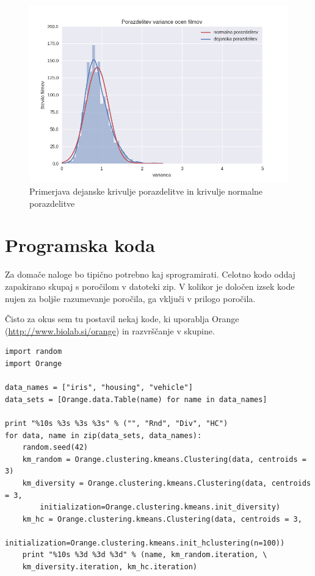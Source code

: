 \documentclass[a4paper,11pt]{article}
\begin{document}
\begin{figure}[htbp]
\begin{center}
\includegraphics[scale=0.7]{porazdelitevNormalna.png}
\caption{Primerjava dejanske krivulje porazdelitve in krivulje normalne porazdelitve}
\label{slika3}
\end{center}
\end{figure}

\section{\label{app-code}Programska koda}

Za domače naloge bo tipično potrebno kaj sprogramirati. Celotno kodo oddaj
zapakirano skupaj s poročilom v datoteki zip. V kolikor je določen izsek kode
nujen za boljše razumevanje poročila, ga vključi v prilogo poročila.

Čisto
za okus sem tu postavil nekaj kode, ki uporablja Orange
(\url{http://www.biolab.si/orange}) in razvrščanje v skupine.


\begin{lstlisting}
import random
import Orange

data_names = ["iris", "housing", "vehicle"]
data_sets = [Orange.data.Table(name) for name in data_names]

print "%10s %3s %3s %3s" % ("", "Rnd", "Div", "HC")
for data, name in zip(data_sets, data_names):
    random.seed(42)
    km_random = Orange.clustering.kmeans.Clustering(data, centroids = 3)
    km_diversity = Orange.clustering.kmeans.Clustering(data, centroids = 3,
        initialization=Orange.clustering.kmeans.init_diversity)
    km_hc = Orange.clustering.kmeans.Clustering(data, centroids = 3,
        initialization=Orange.clustering.kmeans.init_hclustering(n=100))
    print "%10s %3d %3d %3d" % (name, km_random.iteration, \
    km_diversity.iteration, km_hc.iteration)
\end{lstlisting}
\end{document}
